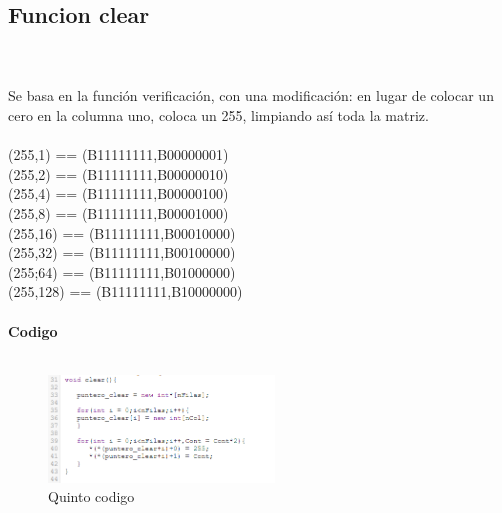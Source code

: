 \documentclass{article}
\begin{document}
\subsection{\large Funcion clear}\\\\
Se basa en la función verificación, con una modificación: en lugar de colocar un cero en la columna uno, coloca un 255, limpiando así toda la matriz.\\\\
(255,1) == (B11111111,B00000001)\\
(255,2) == (B11111111,B00000010) \\
(255,4) == (B11111111,B00000100) \\ 
(255,8) == (B11111111,B00001000) \\
(255,16) == (B11111111,B00010000) \\
(255,32) == (B11111111,B00100000) \\
(255;64) == (B11111111,B01000000) \\
(255,128) == (B11111111,B10000000) \\
\\
\textbf{\large Codigo}\\\\
\begin{figure}[h]
    \includegraphics[width=6cm]{Imagen8.png}
    \centering
    \caption{Quinto codigo}
    \label{fig:Imagen8}
\end{figure}\\\\
\end{document}
